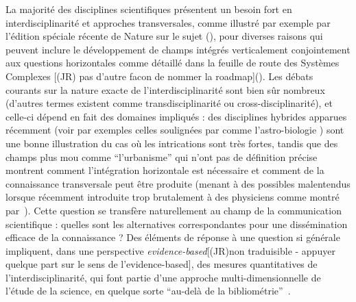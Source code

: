 {La majorité des disciplines scientifiques présentent un besoin fort en interdisciplinarité et approches transversales, comme illustré par exemple par l'édition spéciale récente de Nature sur le sujet (\cite{natureInterdisc}), pour diverses raisons qui peuvent inclure le développement de champs intégrés verticalement conjointement aux questions horizontales comme détaillé dans la feuille de route des Systèmes Complexes [(JR) pas d'autre facon de nommer la roadmap](\cite{2009arXiv0907.2221B}). Les débats courants sur la nature exacte de l'interdisciplinarité sont bien sûr nombreux (d'autres termes existent comme transdisciplinarité ou cross-disciplinarité), et celle-ci dépend en fait des domaines impliqués : des disciplines hybrides apparues récemment (voir par exemples celles soulignées par \cite{bais2010praise} comme l'astro-biologie ) sont une bonne illustration du cas où les intrications sont très fortes, tandis que des champs plus mou comme ``l'urbanisme'' qui n'ont pas de définition précise montrent comment l'intégration horizontale est nécessaire et comment de la connaissance transversale peut être produite (menant à des possibles malentendus lorsque récemment introduite trop brutalement à des physiciens comme montré par~\cite{dupuy2015sciences}). Cette question se transfère naturellement au champ de la communication scientifique : quelles sont les alternatives correspondantes pour une dissémination efficace de la connaissance ? Des éléments de réponse à une question si générale impliquent, dans une perspective \emph{evidence-based}[(JR)non traduisible - appuyer quelque part sur le sens de l'evidence-based], des mesures quantitatives de l'interdisciplinarité, qui font partie d'une approche multi-dimensionnelle de l'étude de la science, en quelque sorte ``au-delà de la bibliométrie''~\cite{cronin2014beyond}.
}


